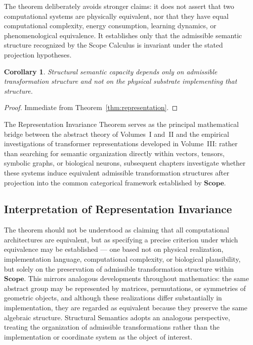 \documentclass[11pt,twoside,openright]{book}
\numberwithin{equation}{chapter}
\theoremstyle{definition}
\theoremstyle{plain}
\newtheorem{corollary}[definition]{Corollary}
\theoremstyle{remark}
\theoremstyle{definition}
\newcommand{\CatScope}{\mathbf{Scope}}
\begin{document}
The theorem deliberately avoids stronger claims: it does not assert that
two computational systems are physically equivalent, nor that they have
equal computational complexity, energy consumption, learning dynamics, or
phenomenological equivalence. It establishes only that the admissible
semantic structure recognized by the Scope Calculus is invariant under
the stated projection hypotheses.

\begin{corollary}
\label{cor:substrate}
Structural semantic capacity depends only on admissible transformation
structure and not on the physical substrate implementing that structure.
\end{corollary}

\begin{proof}
Immediate from Theorem~\ref{thm:representation}.
\end{proof}

The Representation Invariance Theorem serves as the principal
mathematical bridge between the abstract theory of Volumes~I and~II and
the empirical investigations of transformer representations developed in
Volume~III: rather than searching for semantic organization directly
within vectors, tensors, symbolic graphs, or biological neurons,
subsequent chapters investigate whether these systems induce equivalent
admissible transformation structures after projection into the common
categorical framework established by $\CatScope$.

\subsection{Interpretation of Representation Invariance}

The theorem should not be understood as claiming that all computational
architectures are equivalent, but as specifying a precise criterion under
which equivalence may be established --- one based not on physical
realization, implementation language, computational complexity, or
biological plausibility, but solely on the preservation of admissible
transformation structure within $\CatScope$. This mirrors analogous
developments throughout mathematics: the same abstract group may be
represented by matrices, permutations, or symmetries of geometric
objects, and although these realizations differ substantially in
implementation, they are regarded as equivalent because they preserve the
same algebraic structure. Structural Semantics adopts an analogous
perspective, treating the organization of admissible transformations
rather than the implementation or coordinate system as the object of
interest.
\end{document}
